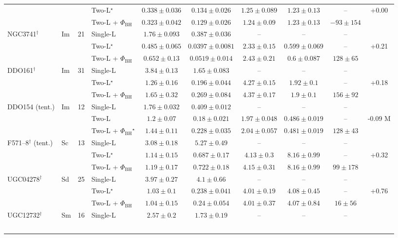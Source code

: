 \documentclass[9pt]{extarticle}
\begin{document}
{\begin{longtable}{llrlcccccc}
 & &  & Two-L$^\star$ & $0.338\pm0.036$ & $0.134\pm0.026$ & $1.25\pm0.089$ & $1.23\pm0.13$ & -- & +0.00 \\
 & &  & Two-L + $\Phi_\mathrm{BH}$ & $0.323\pm0.042$ & $0.129\pm0.026$ & $1.24\pm0.09$ & $1.23\pm0.13$ & $-93\pm154$ & \\
\midrule
NGC3741$^\dagger$ & Im & 21 & Single-L & $1.76\pm0.093$ & $0.387\pm0.036$ & -- & -- & -- & \\
 & &  & Two-L$^\star$ & $0.485\pm0.065$ & $0.0397\pm0.0081$ & $2.33\pm0.15$ & $0.599\pm0.069$ & -- & +0.21 \\
 & &  & Two-L + $\Phi_\mathrm{BH}$ & $0.652\pm0.13$ & $0.0519\pm0.014$ & $2.43\pm0.21$ & $0.6\pm0.087$ & $128\pm65$ & \\
\midrule
DDO161$^\dagger$ & Im & 31 & Single-L & $3.84\pm0.13$ & $1.65\pm0.083$ & -- & -- & -- & \\
 & &  & Two-L$^\star$ & $1.26\pm0.16$ & $0.196\pm0.044$ & $4.27\pm0.15$ & $1.92\pm0.1$ & -- & +0.18 \\
 & &  & Two-L + $\Phi_\mathrm{BH}$ & $1.65\pm0.32$ & $0.269\pm0.084$ & $4.37\pm0.17$ & $1.9\pm0.1$ & $156\pm92$ & \\
\midrule
DDO154 (tent.) & Im & 12 & Single-L & $1.76\pm0.032$ & $0.409\pm0.012$ & -- & -- & -- & \\
 & &  & Two-L & $1.2\pm0.07$ & $0.18\pm0.021$ & $1.97\pm0.048$ & $0.486\pm0.019$ & -- & -0.09 M\\
 & &  & Two-L + $\Phi_\mathrm{BH}$$^\star$ & $1.44\pm0.11$ & $0.228\pm0.035$ & $2.04\pm0.057$ & $0.481\pm0.019$ & $128\pm43$ & \\
\midrule
F571--8$^\dagger$ (tent.) & Sc & 13 & Single-L & $3.08\pm0.18$ & $5.27\pm0.49$ & -- & -- & -- & \\
 & &  & Two-L$^\star$ & $1.14\pm0.15$ & $0.687\pm0.17$ & $4.13\pm0.3$ & $8.16\pm0.99$ & -- & +0.32 \\
 & &  & Two-L + $\Phi_\mathrm{BH}$ & $1.19\pm0.17$ & $0.722\pm0.18$ & $4.15\pm0.31$ & $8.16\pm0.99$ & $99\pm178$ & \\
\midrule
UGC04278$^\dagger$ & Sd & 25 & Single-L & $3.97\pm0.27$ & $4.1\pm0.66$ & -- & -- & -- & \\
 & &  & Two-L$^\star$ & $1.03\pm0.1$ & $0.238\pm0.041$ & $4.01\pm0.19$ & $4.08\pm0.45$ & -- & +0.76 \\
 & &  & Two-L + $\Phi_\mathrm{BH}$ & $1.04\pm0.15$ & $0.24\pm0.054$ & $4.01\pm0.37$ & $4.07\pm0.84$ & $16\pm56$ & \\
\midrule
UGC12732$^\dagger$ & Sm & 16 & Single-L & $2.57\pm0.2$ & $1.73\pm0.19$ & -- & -- & -- & \\
$$
\end{longtable}}
\end{document}
